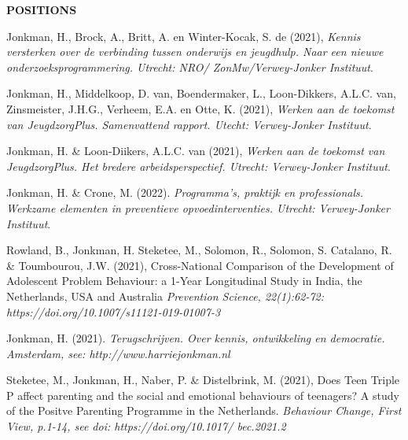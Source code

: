\documentclass[
  16,
]{article}
\begin{document}
\begin{large}{\bf POSITIONS}
\vspace{3pt}

Jonkman, H., Brock, A., Britt, A. en Winter-Kocak, S. de (2021),
\emph{Kennis versterken over de verbinding tussen onderwijs en jeugdhulp. Naar een nieuwe onderzoeksprogrammering. Utrecht: NRO/ ZonMw/Verwey-Jonker Instituut}.

\vspace{3pt}

Jonkman, H., Middelkoop, D. van, Boendermaker, L., Loon-Dikkers, A.L.C.
van, Zinsmeister, J.H.G., Verheem, E.A. en Otte, K. (2021),
\emph{Werken aan de toekomst van JeugdzorgPlus. Samenvattend rapport. Utecht: Verwey-Jonker Instituut}.

\vspace{3pt}

Jonkman, H. \& Loon-Diikers, A.L.C. van (2021),
\emph{Werken aan de toekomst van JeugdzorgPlus. Het bredere arbeidsperspectief. Utrecht: Verwey-Jonker Instituut}.

\vspace{3pt}

Jonkman, H. \& Crone, M. (2022).
\emph{Programma’s, praktijk en professionals. Werkzame elementen in preventieve opvoedinterventies. Utrecht: Verwey-Jonker Instituut}.

\vspace{3pt}

Rowland, B., Jonkman, H. Steketee, M., Solomon, R., Solomon, S.
Catalano, R. \& Toumbourou, J.W. (2021), Cross-National Comparison of
the Development of Adolescent Problem Behaviour: a 1-Year Longitudinal
Study in India, the Netherlands, USA and Australia
\emph{Prevention Science, 22(1):62-72: https://doi.org/10.1007/s11121-019-01007-3}

\vspace{3pt}

Jonkman, H. (2021).
\emph{Terugschrijven. Over kennis, ontwikkeling en democratie. Amsterdam, see: http://www.harriejonkman.nl}

\vspace{3pt}

Steketee, M., Jonkman, H., Naber, P. \& Distelbrink, M. (2021), Does
Teen Triple P affect parenting and the social and emotional behaviours
of teenagers? A study of the Positve Parenting Programme in the
Netherlands.
\emph{Behaviour Change, First View, p.1-14, see doi: https://doi.org/10.1017/ bec.2021.2}

\vspace{3pt}


\end{large}
\end{document}
